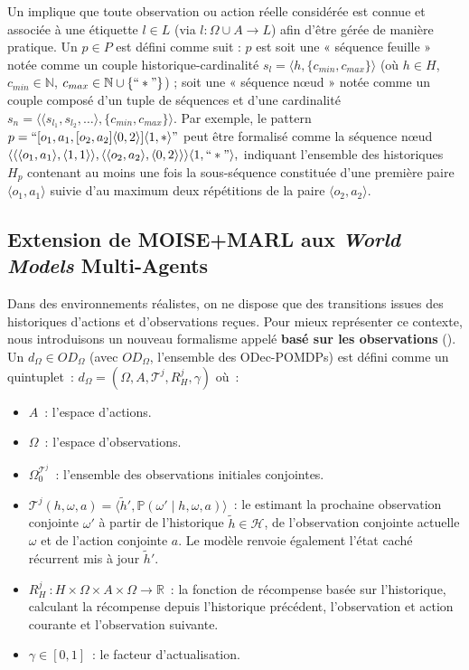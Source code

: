 Un  implique que toute observation ou action réelle considérée est connue et associée à une étiquette \(l \in L\) (via \(l: \Omega \cup A \to L\)) afin d'être gérée de manière pratique. Un  \(p \in P\) est défini comme suit : \(p\) est soit une « séquence feuille » notée comme un couple historique-cardinalité \(s_l = \langle h, \{c_{min}, c_{max}\} \rangle\) (où \(h \in H\), \(c_{min} \in \mathbb{N}\), \(c_{max} \in \mathbb{N} \cup \{``*"\}\)) ; soit une « séquence nœud » notée comme un couple composé d'un tuple de séquences et d'une cardinalité \(s_n = \langle \langle s_{l_1}, s_{l_2}, \dots \rangle, \{c_{min}, c_{max}\} \rangle\). Par exemple, le pattern
$
    p = ``[o_1,a_1,[o_2,a_2]\langle0,2\rangle]\langle1,*\rangle"
$
peut être formalisé comme la séquence nœud
$
    \langle \langle \langle o_1,a_1\rangle,\langle 1,1 \rangle \rangle, \langle \langle o_2,a_2\rangle,\langle 0,2 \rangle \rangle \rangle \langle 1,``*"\rangle,
$
indiquant l'ensemble des historiques \(H_p\) contenant au moins une fois la sous-séquence constituée d'une première paire \(\langle o_1,a_1\rangle\) suivie d'au maximum deux répétitions de la paire \(\langle o_2,a_2\rangle\).

\subsection{Extension de MOISE+MARL aux \textit{World Models} Multi-Agents}

\noindent Dans des environnements réalistes, on ne dispose que des transitions issues des historiques d'actions et d'observations reçues. Pour mieux représenter ce contexte, nous introduisons un nouveau formalisme appelé \textbf{ basé sur les observations} (). Un  $d_\Omega \in OD_\Omega$ (avec $OD_\Omega$, l'ensemble des ODec-POMDPs) est défini comme un quintuplet~:
%
$d_\Omega = \left(\Omega, A, \mathcal{T}^j, R^j_H, \gamma \right)$
%
où~:
\begin{itemize}
    \item $A$~: l'espace d'actions.
    \item $\Omega$~: l'espace d'observations.
    \item $\Omega^{\mathcal{T}^j}_0$~: l'ensemble des observations initiales conjointes.
    \item $\mathcal{T}^j(h, \omega, a) = \langle \tilde{h}', \mathbb{P}(\omega' \mid h, \omega, a) \rangle$~: le  estimant la prochaine observation conjointe $\omega'$ à partir de l'historique $\tilde{h} \in \mathcal{H}$, de l'observation conjointe actuelle $\omega$ et de l'action conjointe $a$. Le modèle renvoie également l'état caché récurrent mis à jour $\tilde{h}'$.
    \item $R^j_H~: H \times \Omega \times A \times \Omega \rightarrow \mathbb{R}$~: la fonction de récompense basée sur l'historique, calculant la récompense depuis l'historique précédent, l'observation et action courante et l'observation suivante.
    \item $\gamma \in [0, 1]$~: le facteur d'actualisation.
\end{itemize}

